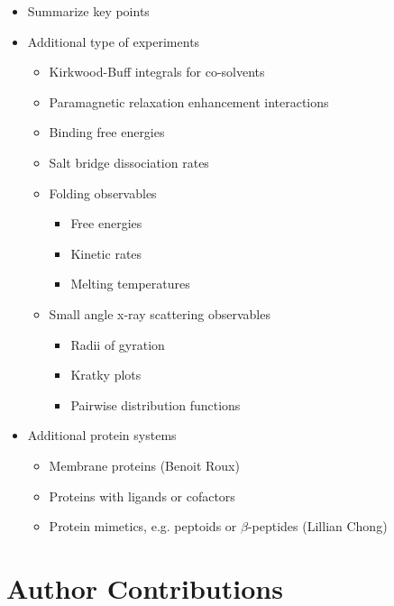 \documentclass[9pt,review]{livecoms}
\begin{document}
\begin{itemize}

\item Summarize key points

\item Additional type of experiments

	\begin{itemize}
	\item Kirkwood-Buff integrals for co-solvents
	\item Paramagnetic relaxation enhancement interactions
	\item Binding free energies
	\item Salt bridge dissociation rates
	\item Folding observables

		\begin{itemize}
		\item Free energies
		\item Kinetic rates
		\item Melting temperatures
		\end{itemize}

	\item Small angle x-ray scattering observables

		\begin{itemize}
		\item Radii of gyration
		\item Kratky plots
		\item Pairwise distribution functions
		\end{itemize}

	\end{itemize}

\item Additional protein systems

	\begin{itemize}
	\item Membrane proteins (Benoit Roux)
	\item Proteins with ligands or cofactors
	\item Protein mimetics, e.g. peptoids or $\beta$-peptides (Lillian Chong)
	\end{itemize}

\end{itemize}

\section{Author Contributions}
%
\end{document}
